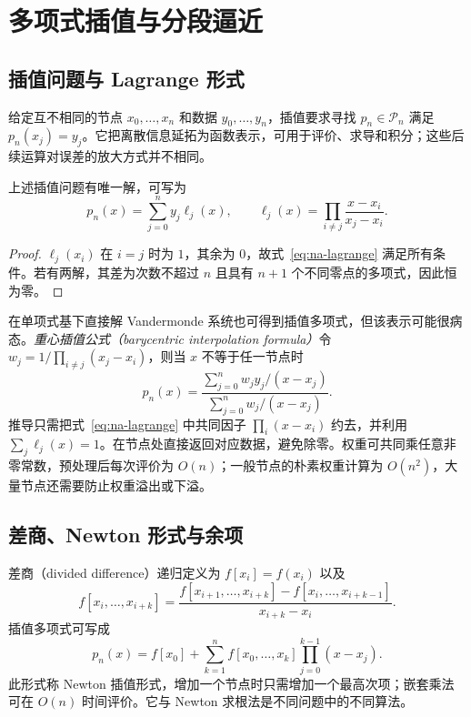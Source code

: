 \setcounter{chapter}{7} %
\chapter{多项式插值与分段逼近}
\label{chap:na-interpolation}

\section{插值问题与 Lagrange 形式}
给定互不相同的节点 $x_0,\ldots,x_n$ 和数据 $y_0,\ldots,y_n$，插值要求寻找 $p_n\in\mathcal P_n$ 满足 $p_n(x_j)=y_j$。它把离散信息延拓为函数表示，可用于评价、求导和积分；这些后续运算对误差的放大方式并不相同。

\begin{theorem}[多项式插值的存在唯一性]
上述插值问题有唯一解，可写为
\begin{equation}
 p_n(x)=\sum_{j=0}^ny_j\ell_j(x),\qquad
 \ell_j(x)=\prod_{i\ne j}\frac{x-x_i}{x_j-x_i}.
 \label{eq:na-lagrange}
\end{equation}
\end{theorem}
\begin{proof}
$\ell_j(x_i)$ 在 $i=j$ 时为 $1$，其余为 $0$，故式~\eqref{eq:na-lagrange} 满足所有条件。若有两解，其差为次数不超过 $n$ 且具有 $n+1$ 个不同零点的多项式，因此恒为零。
\end{proof}

在单项式基下直接解 Vandermonde 系统也可得到插值多项式，但该表示可能很病态。\emph{重心插值公式（barycentric interpolation formula）}令 $w_j=1/\prod_{i\ne j}(x_j-x_i)$，则当 $x$ 不等于任一节点时
\begin{equation}
 p_n(x)=\frac{\sum_{j=0}^n w_jy_j/(x-x_j)}{\sum_{j=0}^n w_j/(x-x_j)}.
 \label{eq:na-barycentric}
\end{equation}
推导只需把式~\eqref{eq:na-lagrange} 中共同因子 $\prod_i(x-x_i)$ 约去，并利用 $\sum_j\ell_j(x)=1$。在节点处直接返回对应数据，避免除零。权重可共同乘任意非零常数，预处理后每次评价为 $O(n)$；一般节点的朴素权重计算为 $O(n^2)$，大量节点还需要防止权重溢出或下溢。

\section{差商、Newton 形式与余项}
差商（divided difference）递归定义为 $f[x_i]=f(x_i)$ 以及
\[
 f[x_i,\ldots,x_{i+k}]=
 \frac{f[x_{i+1},\ldots,x_{i+k}]-f[x_i,\ldots,x_{i+k-1}]}{x_{i+k}-x_i}.
\]
插值多项式可写成
\[
 p_n(x)=f[x_0]+\sum_{k=1}^nf[x_0,\ldots,x_k]\prod_{j=0}^{k-1}(x-x_j).
\]
此形式称 Newton 插值形式，增加一个节点时只需增加一个最高次项；嵌套乘法可在 $O(n)$ 时间评价。它与 Newton 求根法是不同问题中的不同算法。

